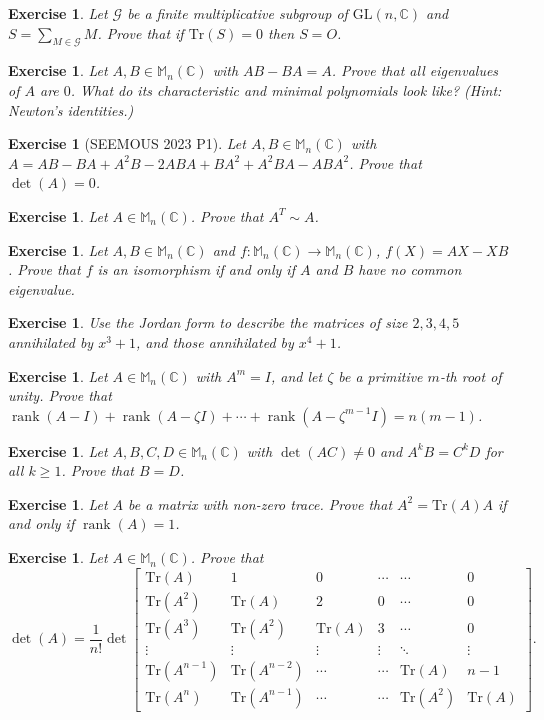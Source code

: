 \documentclass[12pt]{article}
\renewcommand{\Tr}{\mathrm{Tr}}
\DeclareMathOperator{\Rank}{rank}
\theoremstyle{breakplain}
\theoremstyle{breakdef}
\newtheorem{ex}[subsubsection]{Exercise}
\theoremstyle{remark}
\begin{document}
\begin{ex}
    Let $\mathscr{G}$ be a finite multiplicative subgroup of $\mathrm{GL}(n,\mathbb{C})$ and $S=\sum_{M\in \mathscr{G}} M$. Prove that if $\Tr(S)=0$ then $S=O$.
\end{ex}
\begin{ex}
    Let $A,B \in \mathbb{M}_n(\mathbb{C})$ with $AB-BA=A$. Prove that all eigenvalues of $A$ are $0$.
    What do its characteristic and minimal polynomials look like?
    (Hint: Newton's identities.)
\end{ex}
\begin{ex}[SEEMOUS 2023 P1]
    Let $A,B \in \mathbb{M}_n(\mathbb{C})$ with $A=AB-BA+A^2B-2ABA+BA^2+A^2BA-ABA^2$. Prove that $\det(A)=0$.
\end{ex}
\begin{ex}
    Let $A\in \mathbb{M}_n(\mathbb{C})$. Prove that $A^T \sim A$.
\end{ex}
\begin{ex}
    Let $A,B\in \mathbb{M}_n(\mathbb{C})$ and $f:\mathbb{M}_n(\mathbb{C}) \to \mathbb{M}_n(\mathbb{C})$, $f(X)=AX-XB$. Prove that $f$ is an isomorphism if and only if $A$ and $B$ have no common eigenvalue.
\end{ex}
\begin{ex}
    Use the Jordan form to describe the matrices of size $2,3,4,5$ annihilated by $x^3+1$, and those annihilated by $x^4+1$.
\end{ex}
\begin{ex}
    Let $A\in \mathbb{M}_n(\mathbb{C})$ with $A^m=I$, and let $\zeta$ be a primitive $m$-th root of unity.
    Prove that $\Rank(A-I)+\Rank(A-\zeta I)+\cdots+\Rank(A-\zeta^{m-1}I)=n(m-1)$.
\end{ex}
\begin{ex}
    Let $A,B,C,D\in \mathbb{M}_n(\mathbb{C})$ with $\det(AC)\neq0$ and $A^kB=C^kD$ for all $k\geq 1$. Prove that $B=D$.
\end{ex}
\begin{ex}
    Let $A$ be a matrix with non-zero trace. Prove that $A^2=\Tr(A) A$ if and only if $\Rank(A)=1$.
\end{ex}
\begin{ex}
    Let $A\in \mathbb{M}_n(\mathbb{C})$. Prove that
    \[\det(A)=\frac{1}{n!}\det\begin{bmatrix}
    \Tr(A) & 1 & 0 & \cdots & \cdots & 0 \\
    \Tr(A^2) & \Tr(A) & 2 & 0 & \cdots & 0 \\
    \Tr(A^3) & \Tr(A^2) & \Tr(A) & 3 & \cdots & 0 \\
    \vdots & \vdots & \vdots & \vdots & \ddots & \vdots \\
    \Tr(A^{n-1}) & \Tr(A^{n-2}) & \cdots & \cdots & \Tr(A) & n-1 \\
     \Tr(A^{n}) & \Tr(A^{n-1}) & \cdots & \cdots & \Tr(A^2) & \Tr(A)
    \end{bmatrix}.\]
\end{ex}
\end{document}
